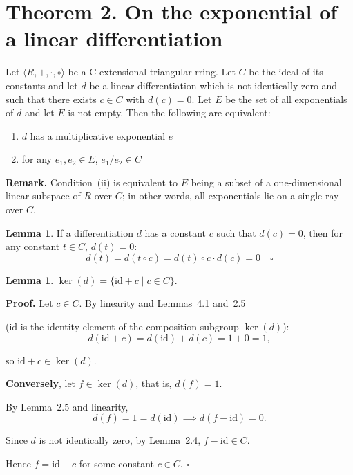 \documentclass[12pt]{article}
\theoremstyle{definition}
\newtheorem{lemma}[definition]{Lemma}
\begin{document}
\vspace{10pt}
\section{Theorem 2. On the exponential of a linear differentiation}

Let $\langle R, +, \cdot, \circ \rangle$ be a C-extensional triangular rring. Let \(C\) be the ideal of its constants and let \(d\) 
be a linear differentiation which is not identically zero and such that there exists \(c \in C\) with \(d(c) = 0\). 
Let \(E\) be the set of all exponentials of \(d\) and let \(E\) is not empty. Then the following are equivalent:
\begin{enumerate}
\item[(i)] \(d\) has a multiplicative exponential $e$
\item[(ii)] for any \(e_{1}, e_{2} \in E\), \(e_{1}/e_{2} \in C\)
\end{enumerate}

\vspace{10pt}
\noindent\textbf{Remark.} Condition~(ii) is equivalent to \(E\) being a subset of a one-dimensional linear subspace of \(R\) over \(C\); 
in other words, all exponentials lie on a single ray over \(C\).

\vspace{10pt}
\begin{lemma} If a differentiation \(d\) has a constant \(c\) such that \(d(c) = 0\), 
    then for any constant \(t \in C\), \(d(t) = 0\):
\[
d(t) = d(t \circ c) = d(t) \circ c \cdot d(c) = 0 \quad \square
\]
\end{lemma}

\vspace{10pt}
\begin{lemma} \(\ker(d) = \{\mathrm{id} + c \mid c \in C\}\).

\vspace{10pt}
\textbf{Proof.} Let \(c \in C\). By linearity and Lemmas~4.1 and~2.5

(\(\mathrm{id}\) is the identity element of the composition subgroup \(\ker(d)\)):
\[
d(\mathrm{id} + c) = d(\mathrm{id}) + d(c) = 1 + 0 = 1,
\]

so \(\mathrm{id} + c \in \ker(d)\).

\vspace{10pt}
\textbf{Conversely}, let \(f \in \ker(d)\), that is, \(d(f) = 1\). 

By Lemma~2.5 and linearity,
\[
d(f) = 1 = d(\mathrm{id}) \implies d(f - \mathrm{id}) = 0.
\]

Since \(d\) is not identically zero, by Lemma~2.4, \(f - \mathrm{id} \in C\). 

Hence \(f = \mathrm{id} + c\) for some constant \(c \in C\). $\square$
\end{lemma}
\end{document}
